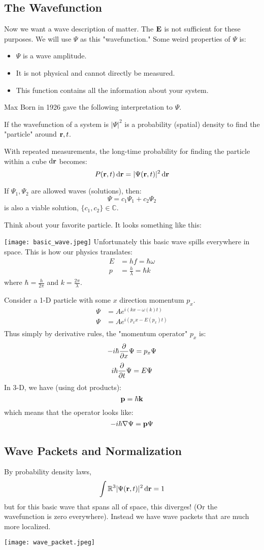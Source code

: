 \subsection{The Wavefunction}
Now we want a wave description of matter. The $\mathbf{E}$ is not sufficient for these purposes. We will use $\Psi$ as this "wavefunction." Some weird properties
of $\Psi$ is:
\begin{itemize}
    \item $\Psi$ is a wave amplitude.
    \item It is not physical and cannot directly be measured.
    \item This function contains all the information about your system.
\end{itemize}
Max Born in 1926 gave the following interpretation to $\Psi$.
\begin{theorem}
    If the wavefunction of a system is $|\Psi|^2$ is a probability (spatial) density to find the "particle" around $\mathbf{r}, t$.
\end{theorem}
With repeated measurements, the long-time probability for finding the particle within a cube $\dd{\mathbf{r}}$ becomes:
\[ P(\mathbf{r}, t) \dd{\mathbf{r}} = |\Psi(\mathbf{r}, t)|^2 \dd{\mathbf{r}} \]
\begin{theorem}[Superposition]
    If $\Psi_1, \Psi_2$ are allowed waves (solutions), then:
    \[ \Psi = c_1 \Psi_1 + c_2 \Psi_2 \]
    is also a viable solution, $\{c_1, c_2\} \in \mathbb{C}$.
\end{theorem}
Think about your favorite particle. It looks something like this:

\texttt{[image: basic\_wave.jpeg]}
Unfortunately this basic wave spills everywhere in space. This is how our physics translates: 
\begin{align*}
    E &= hf = \hbar \omega \\
    p &= \frac{h}{\lambda} = \hbar k
\end{align*}
where $\hbar = \frac{h}{2\pi}$ and $k = \frac{2\pi}{\lambda}$.

Consider a 1-D particle with some $x$ direction momentum $p_x$.
\begin{align*}
    \Psi &= A e^{i(k x - \omega(k) t)} \\
    \Psi &= Ae^{i(p_x x - E(p_x) t)} \\
\end{align*}
Thus simply by derivative rules, the "momentum operator" $p_x$ is:
\[ - i \hbar \partialderivative{}{x} \Psi = p_x \Psi \]
\[ i \hbar \partialderivative{}{t} \Psi = E \Psi \]
In 3-D, we have (using dot products):
\[ \mathbf{p} = \hbar \mathbf{k} \]
which means that the operator looks like:
\[ - i \hbar \nabla \Psi = \mathbf{p} \Psi\]

\subsection{Wave Packets and Normalization}
By probability density laws,
\[ \int{\mathbb{R}^3} |\Psi(\mathbf{r}, t)|^2 \dd{\mathbf{r}} = 1 \]
but for this basic wave that spans all of space, this diverges! (Or the wavefunction is zero everywhere). Instead we have
wave packets that are much more localized.

\texttt{[image: wave\_packet.jpeg]}

